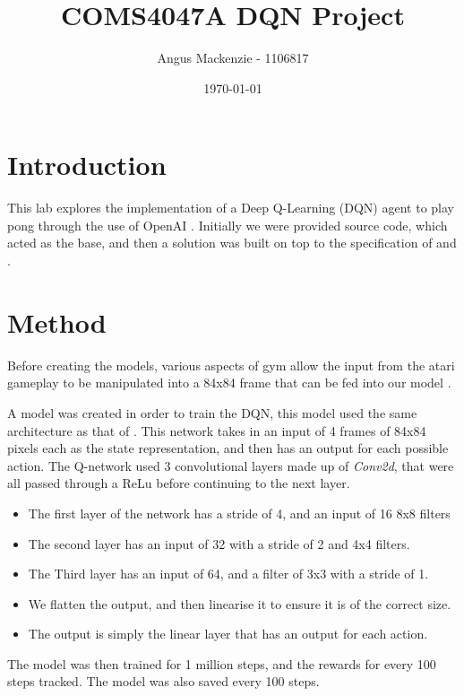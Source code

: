 \documentclass[10pt]{article}
\begin{document}
\title{COMS4047A DQN Project}
\author{Angus Mackenzie - 1106817}
\date{\today} 
\maketitle 
\pagestyle{fancy}
\fancyhf{}
\fancyhead[R]{\thepage}
{}
\section{Introduction}
This lab explores the implementation of a Deep Q-Learning (DQN) agent to play pong through the use of OpenAI \cite{openai}. Initially we were provided source code, which acted as the base, and then a solution was built on top to the specification of \cite{Deepmind} and \cite{NaturePaper}.

\section{Method}
Before creating the models, various aspects of gym allow the input from the atari gameplay to be manipulated into a 84x84 frame that can be fed into our model \cite{openai}.

A model was created in order to train the DQN, this model used the same architecture as that of \cite{NaturePaper}. This network takes in an input of 4 frames of 84x84 pixels each as the state representation, and then has an output for each possible action. The Q-network used 3 convolutional layers made up of \emph{Conv2d}, that were all passed through a ReLu before continuing to the next layer.
\begin{itemize}
    \item The first layer of the network has a stride of 4, and an input of 16 8x8 filters
    \item The second layer has an input of 32 with a stride of 2 and 4x4 filters.
    \item The Third layer has an input of 64, and a filter of 3x3 with a stride of 1.
    \item We flatten the output, and then linearise it to ensure it is of the correct size.
    \item The output is simply the linear layer that has an output for each action. 
\end{itemize}   

The model was then trained for 1 million steps, and the rewards for every 100 steps tracked. The model was also saved every 100 steps. 
\end{document}
